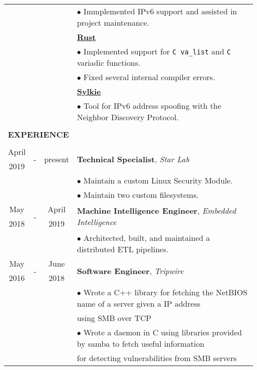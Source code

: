 \documentclass[10pt]{article}
\begin{document}
\begin{table}[ht]
\begin{tabular}{@{\hspace{0mm}}c@{\hspace{1mm}}c@{\hspace{3mm}}cl}
            & & & $\bullet$ Immplemented IPv6 support and assisted in project maintenance.\\[2mm]
            & & & \textbf{\href{https://github.com/rust-lang}{Rust}}\\
            & & & $\bullet$ Implemented support for \texttt{C va\_list} and \texttt{C} variadic functions.\\[2mm]
            & & & $\bullet$ Fixed several internal compiler errors.\\[2mm]
            & & & \textbf{\href{https://github.com/dlrobertson/sylkie}{Sylkie}}\\
            & & & $\bullet$ Tool for IPv6 address spoofing with the Neighbor Discovery Protocol.\\[2mm]
            \hline\\[-3mm]
            \multicolumn{4}{l}{\large{\textbf{EXPERIENCE}}}\\
            \hline\\[-2mm]
            April & \multirow{2}{*}{-} & \multirow{2}{*}{present} & \multirow{2}{*}{\textbf{Technical Specialist}, \textit{Star Lab}}\\
            2019 & & &\\
            & & & $\bullet$ Maintain a custom Linux Security Module.\\
            & & & $\bullet$ Maintain two custom filesystems.\\
            May & \multirow{2}{*}{-} & April & \multirow{2}{*}{\textbf{Machine Intelligence Engineer}, \textit{Embedded Intelligence}}\\
            2018 & & 2019 &\\
            & & & $\bullet$ Architected, built, and maintained a distributed ETL pipelines.\\
            May & \multirow{2}{*}{-} & June & \multirow{2}{*}{\textbf{Software Engineer}, \textit{Tripwire}}\\
            2016 & & 2018 &\\
            & & & $\bullet$ Wrote a C++ library for fetching the NetBIOS name of a server given a IP address\\
            & & & \hspace*{4mm}using SMB over TCP\\
            & & & $\bullet$ Wrote a daemon in C using libraries provided by samba to fetch useful information\\
            & & & \hspace*{4mm}for detecting vulnerabilities from SMB servers\\

\end{tabular}
\end{table}
\end{document}
